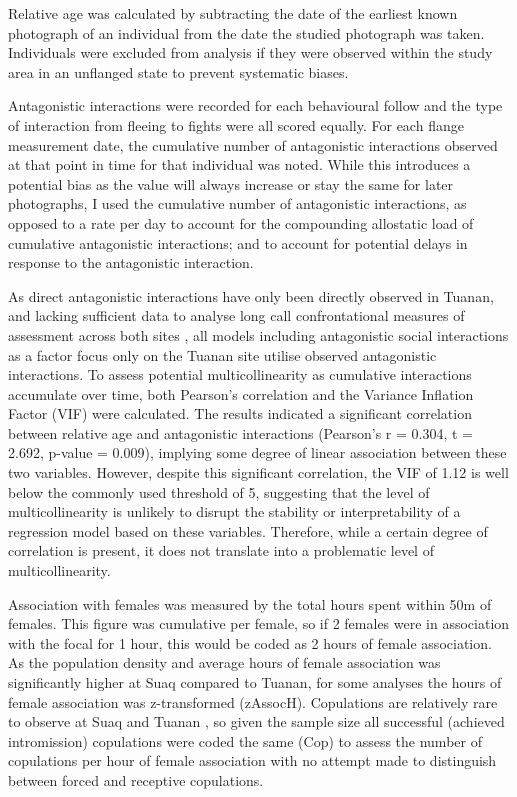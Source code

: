 Relative age was calculated by subtracting the date of the earliest known photograph of an individual from the date the studied photograph was taken. Individuals were excluded from analysis if they were observed within the study area in an unflanged state to prevent systematic biases.

Antagonistic interactions were recorded for each behavioural follow and the type of interaction from fleeing to fights were all scored equally. For each flange measurement date, the cumulative number of antagonistic interactions observed at that point in time for that individual was noted. While this introduces a potential bias as the value will always increase or stay the same for later photographs, I used the cumulative number of antagonistic interactions, as opposed to a rate per day to account for the compounding allostatic load of cumulative antagonistic interactions; and to account for potential delays in response to the antagonistic interaction.

As direct antagonistic interactions have only been directly observed in Tuanan, and lacking sufficient data to analyse long call confrontational measures of assessment across both sites \citep{Spillmann.2016}, all models including antagonistic social interactions as a factor focus only on the Tuanan site utilise observed antagonistic interactions. To assess potential multicollinearity as cumulative interactions accumulate over time, both Pearson's correlation and the Variance Inflation Factor (VIF) were calculated. The results indicated a significant correlation between relative age and antagonistic interactions (Pearson's r = 0.304, t = 2.692, p-value = 0.009), implying some degree of linear association between these two variables. However, despite this significant correlation, the VIF of 1.12 is well below the commonly used threshold of 5, suggesting that the level of multicollinearity is unlikely to disrupt the stability or interpretability of a regression model based on these variables. Therefore, while a certain degree of correlation is present, it does not translate into a problematic level of multicollinearity.

Association with females was measured by the total hours spent within 50m of females. This figure was cumulative per female, so if 2 females were in association with the focal for 1 hour, this would be coded as 2 hours of female association. As the population density and average hours of female association was significantly higher at Suaq compared to Tuanan, for some analyses the hours of female association was z-transformed (zAssocH). Copulations are relatively rare to observe at Suaq and Tuanan \citep{Kunz.2023}, so given the sample size all successful (achieved intromission) copulations were coded the same (Cop) to assess the number of copulations per hour of female association with no attempt made to distinguish between forced and receptive copulations. 


